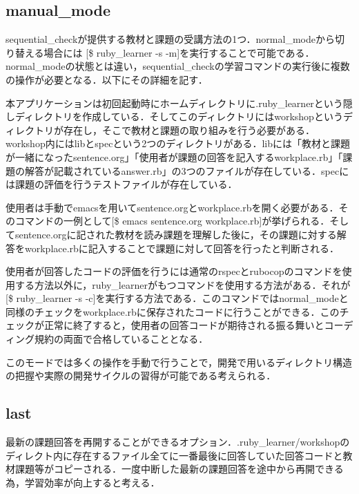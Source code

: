 \subsection{manual\_mode}\label{manual_mode}
sequential\_checkが提供する教材と課題の受講方法の1つ．normal\_modeから切り替える場合には [\$ ruby\_learner -s -m]を実行することで可能である．normal\_modeの状態とは違い，sequential\_checkの学習コマンドの実行後に複数の操作が必要となる．以下にその詳細を記す．
\begin{description}
\def\labelenumi{\arabic{enumi}.}
\tightlist
\item[ディレクトリ構造] 本アプリケーションは初回起動時にホームディレクトリに.ruby\_learnerという隠しディレクトリを作成している．そしてこのディレクトリにはworkshopというディレクトリが存在し，そこで教材と課題の取り組みを行う必要がある．workshop内にはlibとspecという2つのディレクトリがある．libには「教材と課題が一緒になったsentence.org」「使用者が課題の回答を記入するworkplace.rb」「課題の解答が記載されているanswer.rb」の3つのファイルが存在している．specには課題の評価を行うテストファイルが存在している．
  
\item[教材と課題の取り組み] 使用者は手動でemacsを用いてsentence.orgとworkplace.rbを開く必要がある．そのコマンドの一例として[\$ emacs sentence.org workplace.rb]が挙げられる．そしてsentence.orgに記された教材を読み課題を理解した後に，その課題に対する解答をworkplace.rbに記入することで課題に対して回答を行ったと判断される．
\item[評価の実行] 使用者が回答したコードの評価を行うには通常のrspecとrubocopのコマンドを使用する方法以外に，ruby\_learnerがもつコマンドを使用する方法がある．それが[\$ ruby\_learner -s -c]を実行する方法である．このコマンドではnormal\_modeと同様のチェックをworkplace.rbに保存されたコードに行うことができる．このチェックが正常に終了すると，使用者の回答コードが期待される振る舞いとコーディング規約の両面で合格していることとなる．
\end{description}
このモードでは多くの操作を手動で行うことで，開発で用いるディレクトリ構造の把握や実際の開発サイクルの習得が可能である考えられる．

\subsection{last}\label{last}
最新の課題回答を再開することができるオプション．.ruby\_learner/workshopのディレクト内に存在するファイル全てに一番最後に回答していた回答コードと教材課題等がコピーされる．一度中断した最新の課題回答を途中から再開できる為，学習効率が向上すると考える．

